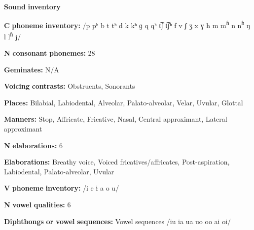 \begin{styleBody}
\textbf{Sound} \textbf{inventory}
\end{styleBody}

\begin{styleBody}
\textbf{C} \textbf{phoneme} \textbf{inventory:} /p pʰ b t tʰ d k kʰ ɡ q qʰ t͡ʃ t͡ʃʰ f v ʃ ʒ x ɣ h m m\textsuperscript{ɦ} n n\textsuperscript{ɦ} ŋ l l\textsuperscript{ɦ} j/
\end{styleBody}

\begin{styleBody}
\textbf{N} \textbf{consonant} \textbf{phonemes:} 28
\end{styleBody}

\begin{styleBody}
\textbf{Geminates:} N/A
\end{styleBody}

\begin{styleBody}
\textbf{Voicing} \textbf{contrasts:} Obstruents, Sonorants
\end{styleBody}

\begin{styleBody}
\textbf{Places:} Bilabial, Labiodental, Alveolar, Palato-alveolar, Velar, Uvular, Glottal
\end{styleBody}

\begin{styleBody}
\textbf{Manners:} Stop, Affricate, Fricative, Nasal, Central approximant, Lateral approximant
\end{styleBody}

\begin{styleBody}
\textbf{N} \textbf{elaborations:} 6
\end{styleBody}

\begin{styleBody}
\textbf{Elaborations:} Breathy voice, Voiced fricatives/affricates, Post-aspiration, Labiodental, Palato-alveolar, Uvular
\end{styleBody}

\begin{styleBody}
\textbf{V} \textbf{phoneme} \textbf{inventory:} /i e ɨ a o u/
\end{styleBody}

\begin{styleBody}
\textbf{N} \textbf{vowel} \textbf{qualities:} 6
\end{styleBody}

\begin{styleBody}
\textbf{Diphthongs} \textbf{or} \textbf{vowel} \textbf{sequences:} Vowel sequences /iu ia ua uo oo ai oi/
\end{styleBody}


